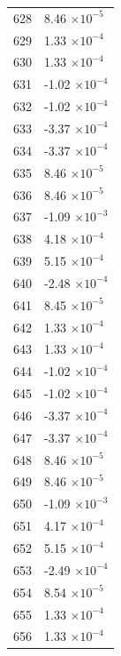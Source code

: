 \documentclass[a4paper,11pt]{article}
\begin{document}
\begin{center}
\begin{longtable}{|R{1.5cm}|R{2.5cm}|}
  628 &         8.46 $\times 10^{          -5}$ \\
  629 &         1.33 $\times 10^{          -4}$ \\
  630 &         1.33 $\times 10^{          -4}$ \\
  631 &        -1.02 $\times 10^{          -4}$ \\
  632 &        -1.02 $\times 10^{          -4}$ \\
  633 &        -3.37 $\times 10^{          -4}$ \\
  634 &        -3.37 $\times 10^{          -4}$ \\
  635 &         8.46 $\times 10^{          -5}$ \\
  636 &         8.46 $\times 10^{          -5}$ \\
  637 &        -1.09 $\times 10^{          -3}$ \\
  638 &         4.18 $\times 10^{          -4}$ \\
  639 &         5.15 $\times 10^{          -4}$ \\
  640 &        -2.48 $\times 10^{          -4}$ \\
  641 &         8.45 $\times 10^{          -5}$ \\
  642 &         1.33 $\times 10^{          -4}$ \\
  643 &         1.33 $\times 10^{          -4}$ \\
  644 &        -1.02 $\times 10^{          -4}$ \\
  645 &        -1.02 $\times 10^{          -4}$ \\
  646 &        -3.37 $\times 10^{          -4}$ \\
  647 &        -3.37 $\times 10^{          -4}$ \\
  648 &         8.46 $\times 10^{          -5}$ \\
  649 &         8.46 $\times 10^{          -5}$ \\
  650 &        -1.09 $\times 10^{          -3}$ \\
  651 &         4.17 $\times 10^{          -4}$ \\
  652 &         5.15 $\times 10^{          -4}$ \\
  653 &        -2.49 $\times 10^{          -4}$ \\
  654 &         8.54 $\times 10^{          -5}$ \\
  655 &         1.33 $\times 10^{          -4}$ \\
  656 &         1.33 $\times 10^{          -4}$ \\

\end{longtable}
\end{center}
\end{document}
